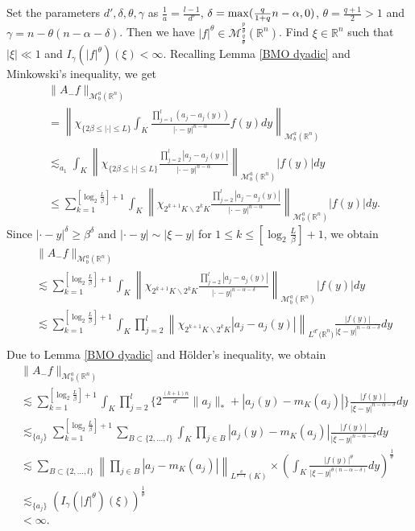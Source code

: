 \documentclass[11pt,a4]{article}
\numberwithin{equation}{section}
\theoremstyle{definition}
\theoremstyle{remark}
\begin{document}
Set the parameters $d', \delta, \theta, \gamma$ as $\frac{1}{a}=\frac{l-1}{d'}$, $\delta= {\rm max}(\frac{q}{1+q}n-\alpha,0)$, $\theta=\frac{q+1}{2} > 1$ and $\gamma=n-\theta(n-\alpha-\delta)$. Then we have $|f|^{\theta} \in {\mathcal M}^{\frac{p}{\theta}}_{\frac{q}{\theta}}({\mathbb R}^n)$. Find $\xi \in \mathbb R^n$ such that $|\xi| \ll 1$ and $I_{\gamma}(|f|^{\theta})(\xi) < \infty$. 
Recalling Lemma \ref{BMO dyadic} and Minkowski's inequality, we get 
\begin{align*}
	&\|A_-f\|_{{\mathcal M}^{a}_{b}({\mathbb R}^n)}\\
	&= \left\| \chi_{\{2\beta \le |\cdot| \le L\}} \int_K \frac{\prod_{j=1}^l (a_j-a_j(y))}{|\cdot - y|^{n-\alpha}}f(y)dy \right\|_{{\mathcal M}^{a}_{b}({\mathbb R}^n)}\\	
	&\lesssim_{a_1} \int_{K}\left\| \chi_{\{2\beta \le |\cdot| \le L\}} \frac{\prod_{j=2}^{l}|a_j-a_j(y)|}{|\cdot-y|^{n-\alpha}} \right\|_{{\mathcal M}^{a}_{b}({\mathbb R}^n)} |f(y)|dy\\
	&\le \sum_{k=1}^{[\log_2{\frac{L}{\beta}}]+1}\int_{K}\left\| \chi_{2^{k+1}K \backslash 2^kK} \frac{\prod_{j=2}^{l}|a_j-a_j(y)|}{|\cdot-y|^{n-\alpha}} \right\|_{{\mathcal M}^{a}_{b}({\mathbb R}^n)} |f(y)|dy.
\end{align*}
Since $|\cdot - y|^{\delta} \ge {\beta}^{\delta}$ and $|\cdot-y| \sim |\xi-y|$ for $1 \le k \le [\log_2{\frac{L}{\beta}}]+1$, we obtain
\begin{align*}
	&\|A_-f\|_{{\mathcal M}^{a}_{b}({\mathbb R}^n)}\\
	&\lesssim \sum_{k=1}^{[\log_2{\frac{L}{\beta}}]+1}\int_{K}\left\| \chi_{2^{k+1}K \backslash 2^kK} \frac{\prod_{j=2}^{l}|a_j-a_j(y)|}{|\cdot-y|^{n-\alpha-\delta}} \right\|_{{\mathcal M}^{a}_{b}({\mathbb R}^n)} |f(y)|dy\\
	&\lesssim \sum_{k=1}^{[\log_2{\frac{L}{\beta}}]+1}\int_{K}\prod_{j=2}^{l} \left\| \chi_{2^{k+1}K \backslash 2^kK} |a_j-a_j(y)| \right\|_{L^{d'}{(\mathbb R}^n)} \frac{|f(y)|}{|\xi-y|^{n-\alpha-\delta}}dy\\
\end{align*}
Due to Lemma \ref{BMO dyadic} and H\"{older's inequality}, we obtain
\begin{align*}
	&\|A_-f\|_{{\mathcal M}^{a}_{b}({\mathbb R}^n)}\\
	&\lesssim \sum_{k=1}^{[\log_2{\frac{L}{\beta}}]+1} \int_{K} \prod_{j=2}^{l} \Big\{2^{\frac{(k+1)n}{d'}}\|a_j\|_*+|a_j(y)-m_{K}(a_j)| \Big\}\frac{|f(y)|}{|\xi-y|^{n-\alpha-\delta}}dy\\
	&\lesssim_{\{a_j\}} \sum_{k=1}^{[\log_2{\frac{L}{\beta}}]+1} \sum_{B \subset \{2,...,l\}} \int_{K} \prod_{j \in B} |a_j(y)-m_{K}(a_j)| \frac{|f(y)|}{|\xi-y|^{n-\alpha-\delta}}dy\\
	&\lesssim \sum_{B \subset \{2,...,l\}} \left\| \prod_{j \in B}  |a_j-m_{K}(a_j)| \right\|_{L^{\frac{\theta}{\theta-1}}(K)} \times \left(\int_{K} \frac{|f(y)|^{\theta}}{|\xi-y|^{\theta(n-\alpha-\delta)}} dy \right)^{\frac{1}{\theta}}\\
	&\lesssim_{\{a_j\}} \left( I_{\gamma}(|f|^{\theta})(\xi) \right)^{\frac{1}{\theta}}\\
	&< \infty.
\end{align*}
\end{document}
